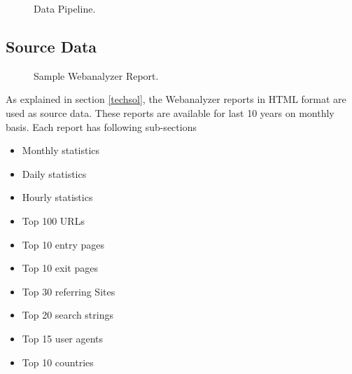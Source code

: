\begin{figure}
\centering
{}
\caption{Data Pipeline.}
\label{fig:datapipeline}
\end{figure}


\subsection{Source Data} \label{sourcedata}
\begin{figure}
\centering
{}
\caption{Sample Webanalyzer Report.}
\label{fig:samplewebanalyzer}
\end{figure}

As explained in section \ref{techsol}, the Webanalyzer reports in HTML format
are used as source data. These reports are available for last 10 years on
monthly basis. Each report has following sub-sections
 \begin{itemize}
 \item Monthly statistics
 \item Daily statistics
 \item Hourly statistics
 \item Top 100 URLs
 \item Top 10 entry pages
 \item Top 10 exit pages
 \item Top 30 referring Sites
 \item Top 20 search strings
 \item Top 15 user agents
 \item Top 10 countries
 \end{itemize}

